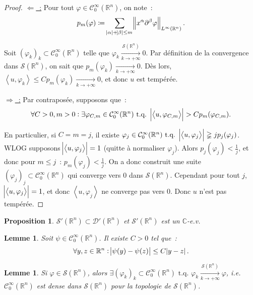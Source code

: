 \documentclass{report}
\newcommand{\C}{{\mathbb C}}
\newcommand{\R}{{\mathbb R}}
\newcommand{\scpr}[2]{\left\langle#1, #2\right\rangle}
\newcommand{\tq}{\text{ t.q. }}
\newcommand{\st}{\tq}
\newcommand{\pinfty}{{+\infty}}
\newtheorem{prp}[thm]{Proposition}
\newtheorem{lem}[thm]{Lemme}
\theoremstyle{definition}
\theoremstyle{remark}
\begin{document}
\begin{proof} \underline {$\Leftarrow$~:} Pour tout $\varphi \in \mathcal C^\infty_0(\R^n)$, on note~:
\[p_m(\varphi) \coloneqq \sum_{\abs \alpha + \abs\beta \leq m}\norm {x^\alpha\partial^\beta\varphi}_{L^\infty(\R^n)}.\]

Soit $(\varphi_k)_k \subset \mathcal C^\infty_0(\R^n)$ telle que $\varphi_k \xrightarrow[k \to \pinfty]{\mathcal S(\R^n)} 0$. Par définition de la convergence dans $\mathcal S(\R^n)$, on sait
que $p_m(\varphi_k) \xrightarrow[k \to \pinfty]{} 0$. Dès lors, $\scpr u{\varphi_k} \leq Cp_m(\varphi_k) \xrightarrow[k \to \pinfty]{} 0$, et donc $u$ est tempérée.

\underline {$\Rightarrow$~:} Par contraposée, supposons que~:
\[\forall C > 0, m > 0 : \exists \varphi_{C,m} \in \mathcal C^\infty_0(\R^n) \st \abs {\scpr u{\varphi_{C,m}}} > Cp_m(\varphi_{C,m}).\]

En particulier, si $C=m=j$, il existe $\varphi_j \in \mathcal C^\infty_0(\R^n) \st \abs {\scpr u{\varphi_j}} \gneqq jp_j(\varphi_j)$. WLOG supposons $\abs {\scpr u{\varphi_j}}=1$
(quitte à normaliser $\varphi_j$). Alors $p_j(\varphi_j) < \frac 1j$, et donc pour $m \leq j$~: $p_m(\varphi_j) < \frac 1j$. On a donc construit une suite
$(\varphi_j)_j \subset \mathcal C^\infty_0(\R^n)$ qui converge vers 0 dans $\mathcal S(\R^n)$. Cependant pour tout $j$, $\abs {\scpr u{\varphi_j}} = 1$, et donc $\scpr u{\varphi_j}$
ne converge pas vers 0. Donc $u$ n'est pas tempérée.
\end{proof}

\begin{prp}\label{prp:distributions tempérées e.v.} $\mathcal S'(\R^n) \subset \mathcal D'(\R^n)$ et $\mathcal S'(\R^n)$ est un $\C$-e.v.
\end{prp}

\begin{lem}\label{lem:C^infty_0 Lipschitz} Soit $\psi \in \mathcal C^\infty_0(\R^n)$. Il existe $C > 0$ tel que~:
\[\forall y, z \in \R^n : \abs {\psi(y)-\psi(z)} \leq C\abs {y-z}.\]
\end{lem}


\begin{lem}\label{lem:C infty 0 dense dans Schwartz} Si $\varphi \in \mathcal S(\R^n)$, alors
$\exists (\varphi_k)_k \subset \mathcal C^\infty_0(\R^n) \st \varphi_k \xrightarrow[k \to \pinfty]{\mathcal S(\R^n)} \varphi$,
i.e. $\mathcal C^\infty_0(\R^n)$ est dense dans $\mathcal S(\R^n)$ pour la topologie de $\mathcal S(\R^n)$.
\end{lem}
\end{document}
